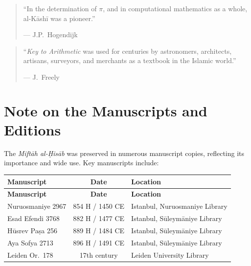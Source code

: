 \documentclass[11pt,a4paper]{article}
\begin{document}
\vspace{0.3cm}

\begin{quote}
``In the determination of $\pi$, and in computational mathematics
as a whole, al-K\=ash\=i was a pioneer.''
\begin{flushright}
--- J.P.\ Hogendijk
\end{flushright}
\end{quote}

\vspace{0.3cm}

\begin{quote}
``\textit{Key to Arithmetic} was used for centuries by astronomers,
architects, artisans, surveyors, and merchants as a textbook in the
Islamic world.''
\begin{flushright}
--- J.\ Freely
\end{flushright}
\end{quote}
\clearpage

\section{Note on the Manuscripts and Editions}
\label{app:manuscripts}

The \textit{Mift\=ah al-\d{H}is\=ab} was preserved in numerous manuscript
copies, reflecting its importance and wide use. Key manuscripts
include:

\begin{longtable}{|l|c|l|}
\hline
\textbf{Manuscript} & \textbf{Date} & \textbf{Location} \\
\hline
\endfirsthead
\hline
\textbf{Manuscript} & \textbf{Date} & \textbf{Location} \\
\hline
\endhead
Nuruosmaniye 2967 & 854 H / 1450 CE & Istanbul, Nuruosmaniye Library
\\
\hline
Esad Efendi 3768 & 882 H / 1477 CE & Istanbul, S\=uleym\=aniye Library \\
\hline
H\=usrev Pa\d{s}a 256 & 889 H / 1484 CE & Istanbul, S\=uleym\=aniye Library \\
\hline
Aya Sofya 2713 & 896 H / 1491 CE & Istanbul, S\=uleym\=aniye Library \\
\hline
Leiden Or.\ 178 & 17th century & Leiden University Library \\
\hline
\end{longtable}
\end{document}
